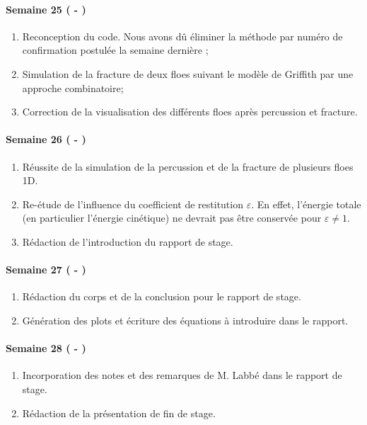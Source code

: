 \paragraph{Semaine 25 ( - )} 
\begin{enumerate}
    \item Reconception du code. Nous avons dû éliminer la méthode par numéro de confirmation postulée la semaine dernière ;
    \item Simulation de la fracture de deux floes suivant le modèle de Griffith par une approche combinatoire;
    \item Correction de la visualisation des différents floes après percussion et fracture.
\end{enumerate}

\paragraph{Semaine 26 ( - )} 
\begin{enumerate}
    \item Réussite de la simulation de la percussion et de la fracture de plusieurs floes 1D.
    \item Re-étude de l'influence du coefficient de restitution $\varepsilon$. En effet, l'énergie totale (en particulier l'énergie cinétique) ne devrait pas être conservée pour $\varepsilon \neq 1$.
    \item Rédaction de l'introduction du rapport de stage.
\end{enumerate}
  
\paragraph{Semaine 27 ( - )} 
\begin{enumerate}
    \item Rédaction du corps et de la conclusion pour le rapport de stage.
    \item Génération des plots et écriture des équations à introduire dans le rapport. 
\end{enumerate}

\paragraph{Semaine 28 ( - )} 
\begin{enumerate}
    \item Incorporation des notes et des remarques de M. Labbé dans le rapport de stage.
    \item Rédaction de la présentation de fin de stage.
\end{enumerate}

